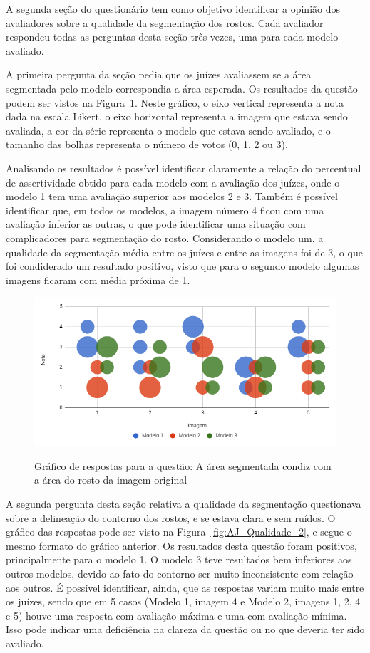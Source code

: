 \documentclass[12pt,oneside,a4paper,english,french,spanish,brazil,]{abntex2}
\begin{document}
A segunda seção do questionário tem como objetivo identificar a opinião dos avaliadores sobre a qualidade da segmentação dos rostos. Cada avaliador respondeu todas as perguntas desta seção três vezes, uma para cada modelo avaliado. 

A primeira pergunta da seção pedia que os juízes avaliassem se a área segmentada pelo modelo correspondia a área esperada. Os resultados da questão podem ser vistos na Figura~\ref{fig:AJ_Qualidade_1}. Neste gráfico, o eixo vertical representa a nota dada na escala Likert, o eixo horizontal representa a imagem que estava sendo avaliada, a cor da série representa o modelo que estava sendo avaliado, e o tamanho das bolhas representa o número de votos (0, 1, 2 ou 3).

Analisando os resultados é possível identificar claramente a relação do percentual de assertividade obtido para cada modelo com a avaliação dos juízes, onde o modelo 1 tem uma avaliação superior aos modelos 2 e 3. Também é possível identificar que, em todos os modelos, a imagem número 4 ficou com uma avaliação inferior as outras, o que pode identificar uma situação com complicadores para segmentação do rosto. Considerando o modelo um, a qualidade da segmentação média entre os juízes e entre as imagens foi de 3, o que foi condiderado um resultado positivo, visto que para o segundo modelo algumas imagens ficaram com média próxima de 1.

\begin{figure}[ht]
\centering
\caption{Gráfico de respostas para a questão: A área segmentada condiz com a área do rosto da imagem original}
\includegraphics[width=1.0\textwidth]{imagens/Avaliacao_Juizes/Qualidade_1.PNG}
\sourceAuthor{}
\label{fig:AJ_Qualidade_1}
\end{figure}

A segunda pergunta desta seção relativa a qualidade da segmentação questionava sobre a delineação do contorno dos rostos, e se estava clara e sem ruídos. O gráfico das respostas pode ser visto na Figura~\ref{fig:AJ_Qualidade_2}, e segue o mesmo formato do gráfico anterior. Os resultados desta questão foram positivos, principalmente para o modelo 1. O modelo 3 teve resultados bem inferiores aos outros modelos, devido ao fato do contorno ser muito inconsistente com relação aos outros. É possível identificar, ainda, que as respostas variam muito mais entre os juízes, sendo que em 5 casos (Modelo 1, imagem 4 e Modelo 2, imagens 1, 2, 4 e 5) houve uma resposta com avaliação máxima e uma com avaliação mínima. Isso pode indicar uma deficiência na clareza da questão ou no que deveria ter sido avaliado.
\end{document}
